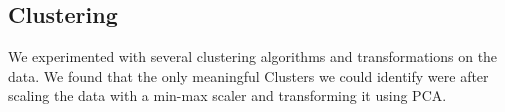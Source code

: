 \subsection{Clustering}%
\label{sub:clustering}

We experimented with several clustering algorithms and transformations on the data. We
found that the only meaningful Clusters we could identify were after scaling the data with
a min-max scaler and transforming it using PCA.
